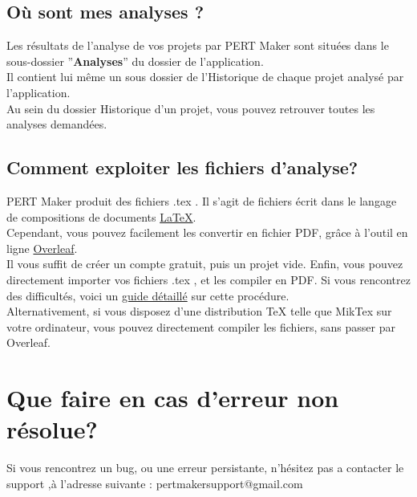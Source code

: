 \documentclass{article}
\begin{document}
\subsection{Où sont mes analyses ?}
Les résultats de l'analyse de vos projets par PERT Maker sont situées dans le sous-dossier
''\textbf{Analyses}'' du dossier de l'application. \\
Il contient lui même un sous dossier de l'Historique de chaque projet analysé par l'application.\\
Au sein du dossier Historique d'un projet, vous pouvez retrouver toutes les analyses demandées.
\subsection{Comment exploiter les fichiers d'analyse?}
PERT Maker produit des fichiers .tex .
Il s'agit de fichiers écrit dans le langage de compositions de documents \textcolor{blue}{\href{https://fr.wikipedia.org/wiki/LaTeX}{\LaTeX}}. \\ 
Cependant, vous pouvez facilement les convertir en fichier PDF, grâce à l'outil en ligne \textcolor{blue}{\href{https://www.overleaf.com/}{Overleaf}}.\\
Il vous suffit de créer un compte gratuit, puis un projet vide. Enfin, vous pouvez directement importer
vos fichiers .tex , et les compiler en PDF.
Si vous rencontrez des difficultés, voici un \textcolor{blue}{\href{https://shorturl.at/ersu1}{guide détaillé}}
sur cette procédure.\\
Alternativement, si vous disposez d'une distribution TeX telle que MikTex sur votre ordinateur,
vous pouvez directement compiler les fichiers, sans passer par Overleaf.

\section{Que faire en cas d'erreur non résolue?}
Si vous rencontrez un bug, ou une erreur persistante, n'hésitez pas a contacter le support ,à l'adresse suivante :
pertmakersupport@gmail.com
\end{document}
